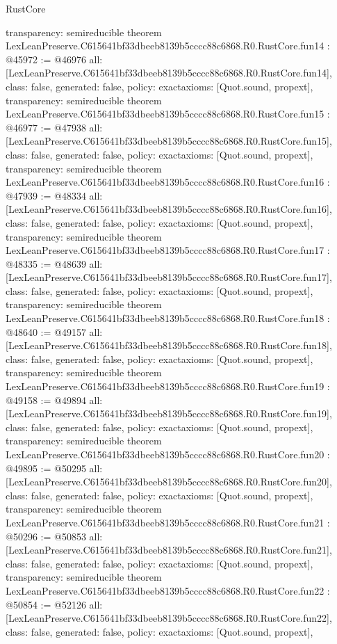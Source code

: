 \begin{lexlean}{RustCore}
\begin{coremodule}
{  transparency: semireducible
}
theorem LexLeanPreserve.C615641bf33dbeeb8139b5cccc88c6868.R0.RustCore.fun14 : @45972 := @46976 {
  all: [LexLeanPreserve.C615641bf33dbeeb8139b5cccc88c6868.R0.RustCore.fun14],
  class: false,
  generated: false,
  policy: exact{axioms: [Quot.sound, propext]},
  transparency: semireducible
}
theorem LexLeanPreserve.C615641bf33dbeeb8139b5cccc88c6868.R0.RustCore.fun15 : @46977 := @47938 {
  all: [LexLeanPreserve.C615641bf33dbeeb8139b5cccc88c6868.R0.RustCore.fun15],
  class: false,
  generated: false,
  policy: exact{axioms: [Quot.sound, propext]},
  transparency: semireducible
}
theorem LexLeanPreserve.C615641bf33dbeeb8139b5cccc88c6868.R0.RustCore.fun16 : @47939 := @48334 {
  all: [LexLeanPreserve.C615641bf33dbeeb8139b5cccc88c6868.R0.RustCore.fun16],
  class: false,
  generated: false,
  policy: exact{axioms: [Quot.sound, propext]},
  transparency: semireducible
}
theorem LexLeanPreserve.C615641bf33dbeeb8139b5cccc88c6868.R0.RustCore.fun17 : @48335 := @48639 {
  all: [LexLeanPreserve.C615641bf33dbeeb8139b5cccc88c6868.R0.RustCore.fun17],
  class: false,
  generated: false,
  policy: exact{axioms: [Quot.sound, propext]},
  transparency: semireducible
}
theorem LexLeanPreserve.C615641bf33dbeeb8139b5cccc88c6868.R0.RustCore.fun18 : @48640 := @49157 {
  all: [LexLeanPreserve.C615641bf33dbeeb8139b5cccc88c6868.R0.RustCore.fun18],
  class: false,
  generated: false,
  policy: exact{axioms: [Quot.sound, propext]},
  transparency: semireducible
}
theorem LexLeanPreserve.C615641bf33dbeeb8139b5cccc88c6868.R0.RustCore.fun19 : @49158 := @49894 {
  all: [LexLeanPreserve.C615641bf33dbeeb8139b5cccc88c6868.R0.RustCore.fun19],
  class: false,
  generated: false,
  policy: exact{axioms: [Quot.sound, propext]},
  transparency: semireducible
}
theorem LexLeanPreserve.C615641bf33dbeeb8139b5cccc88c6868.R0.RustCore.fun20 : @49895 := @50295 {
  all: [LexLeanPreserve.C615641bf33dbeeb8139b5cccc88c6868.R0.RustCore.fun20],
  class: false,
  generated: false,
  policy: exact{axioms: [Quot.sound, propext]},
  transparency: semireducible
}
theorem LexLeanPreserve.C615641bf33dbeeb8139b5cccc88c6868.R0.RustCore.fun21 : @50296 := @50853 {
  all: [LexLeanPreserve.C615641bf33dbeeb8139b5cccc88c6868.R0.RustCore.fun21],
  class: false,
  generated: false,
  policy: exact{axioms: [Quot.sound, propext]},
  transparency: semireducible
}
theorem LexLeanPreserve.C615641bf33dbeeb8139b5cccc88c6868.R0.RustCore.fun22 : @50854 := @52126 {
  all: [LexLeanPreserve.C615641bf33dbeeb8139b5cccc88c6868.R0.RustCore.fun22],
  class: false,
  generated: false,
  policy: exact{axioms: [Quot.sound, propext]},
}
\end{coremodule}
\end{lexlean}
